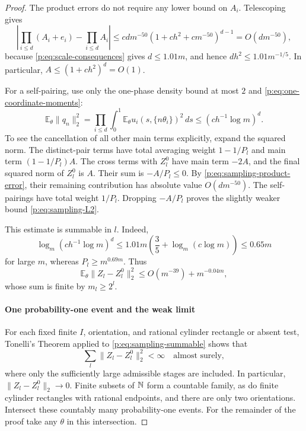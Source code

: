 \begin{proof}
The product errors do not require any lower bound on $A_i$.
Telescoping gives
\begin{equation}\label{p:eq:sampling-product-error}
 \left|\prod_{i\le d}(A_i+e_i)-\prod_{i\le d}A_i\right|
 \le cdm^{-50}(1+ch^2+cm^{-50})^{d-1}
 =O(dm^{-50}),
\end{equation}
because \eqref{p:eq:scale-consequences} gives $d\le1.01m$, and hence
$dh^2\le1.01m^{-1/5}$.  In particular,
$A\le(1+ch^2)^d=O(1)$.

For a self-pairing, use only the one-phase density bound at most $2$
and \eqref{p:eq:one-coordinate-moments}:
\[
 \mathbb E_\theta\|q_n\|_2^2
 =\prod_{i\le d}\int_0^1
            \mathbb E_\theta u_i(s,\{n\theta_i\})^2\,ds
 \le(c h^{-1}\log m)^d.
\]
To see the cancellation of all other main terms explicitly, expand
the squared norm.  The distinct-pair terms have total averaging
weight $1-1/P_l$ and main term $(1-1/P_l)A$.  The cross terms with
$Z_l^0$ have main term $-2A$, and the final squared norm of $Z_l^0$
is $A$.  Their sum is $-A/P_l\le0$.  By
\eqref{p:eq:sampling-product-error}, their remaining contribution
has absolute value $O(dm^{-50})$.  The self-pairings have total
weight $1/P_l$.  Dropping $-A/P_l$ proves the slightly weaker
bound \eqref{p:eq:sampling-L2}.

This estimate is summable in $l$.  Indeed,
\[
 \log_m (c h^{-1}\log m)^d
 \le1.01m\left(\frac35+\log_m(c\log m)\right)
 \le0.65m
\]
for large $m$, whereas $P_l\ge m^{0.69m}$.  Thus
\begin{equation}\label{p:eq:sampling-summable}
 \mathbb E_\theta\|Z_l-Z_l^0\|_2^2
 \le O(m^{-39})+m^{-0.04m},
\end{equation}
whose sum is finite by $m_l\ge2^l$.

\paragraph{One probability-one event and the weak limit}

For each fixed finite $I$, orientation, and rational cylinder
rectangle or absent test, Tonelli's Theorem applied to
\eqref{p:eq:sampling-summable} shows that
\[
 \sum_l\|Z_l-Z_l^0\|_2^2<\infty
 \quad\text{almost surely},
\]
where only the sufficiently large admissible stages are included.
In particular, $\|Z_l-Z_l^0\|_2\to0$.  Finite subsets of $\mathbb N$
form a countable family, as do finite cylinder rectangles with
rational endpoints, and there are only two orientations.  Intersect
these countably many probability-one events.  For the remainder
of the proof take any $\theta$ in this intersection.


\end{proof}
